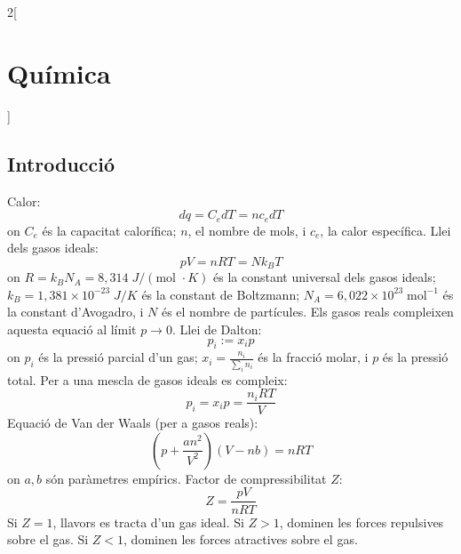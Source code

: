 \documentclass[class=article,10pt,crop=false]{standalone}
\begin{document}
\begin{multicols}{2}[\section{Química}]
\subsection{Introducció}
Calor: $$dq=C_edT=nc_edT$$ {\footnotesize on $C_e$ és la capacitat calorífica; $n$, el nombre de mols, i $c_e$, la calor específica.}\newline
Llei dels gasos ideals: $$pV=nRT=Nk_BT$$ {\footnotesize on $R=k_BN_A=8,314\;J/(\text{mol }\cdot K)$ és la cons\-tant universal dels gasos ideals; $k_B=1,381\times 10^{-23}\;J/K$ és la constant de Boltzmann; $N_A=6,022\times10^{23}\;\text{mol}^{-1}$ és la constant d'Avogadro, i $N$ és el nombre de partícules. Els gasos reals compleixen aquesta equació al límit $p\to 0$.}\newline
Llei de Dalton: $$p_i:=x_ip$$ {\footnotesize on $p_i$ és la pressió parcial d'un gas; $x_i=\frac{n_i}{\sum_in_i}$ és la fracció molar, i $p$ és la pressió total.}\newline
Per a una mescla de gasos ideals es compleix: $$p_i=x_ip=\frac{n_iRT}{V}$$
Equació de Van der Waals (per a gasos reals): $$\left(p+\frac{an^2}{V^2}\right)\left(V-nb\right)=nRT$$ {\footnotesize on $a,b$ són paràmetres empírics.}\newline
Factor de compressibilitat $Z$: $$Z=\frac{pV}{nRT}$$ {\footnotesize Si $Z=1$, llavors es tracta d'un gas ideal. Si $Z>1$, dominen les forces repulsives sobre el gas. Si $Z<1$, dominen les forces atractives sobre el gas.}

\end{multicols}
\end{document}
